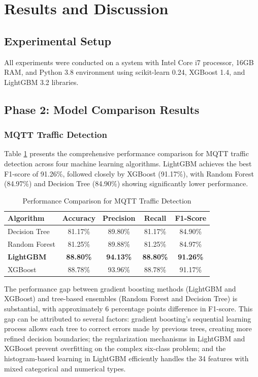 \documentclass[conference]{IEEEtran}
\begin{document}
\section{Results and Discussion}

\subsection{Experimental Setup}

All experiments were conducted on a system with Intel Core i7 processor, 16GB RAM, and Python 3.8 environment using scikit-learn 0.24, XGBoost 1.4, and LightGBM 3.2 libraries.


\subsection{Phase 2: Model Comparison Results}

\subsubsection{MQTT Traffic Detection}

Table \ref{tab:mqtt_results} presents the comprehensive performance comparison for MQTT traffic detection across four machine learning algorithms. LightGBM achieves the best F1-score of 91.26\%, followed closely by XGBoost (91.17\%), with Random Forest (84.97\%) and Decision Tree (84.90\%) showing significantly lower performance.

\begin{table}[htbp]
\centering
\caption{Performance Comparison for MQTT Traffic Detection}
\label{tab:mqtt_results}
\begin{tabular}{lcccc}
\toprule
Algorithm & Accuracy & Precision & Recall & F1-Score \\
\midrule
Decision Tree & 81.17\% & 89.80\% & 81.17\% & 84.90\% \\
Random Forest & 81.25\% & 89.88\% & 81.25\% & 84.97\% \\
\textbf{LightGBM} & \textbf{88.80\%} & \textbf{94.13\%} & \textbf{88.80\%} & \textbf{91.26\%} \\
XGBoost & 88.78\% & 93.96\% & 88.78\% & 91.17\% \\
\bottomrule
\end{tabular}
\end{table}

The performance gap between gradient boosting methods (LightGBM and XGBoost) and tree-based ensembles (Random Forest and Decision Tree) is substantial, with approximately 6 percentage points difference in F1-score. This gap can be attributed to several factors: gradient boosting's sequential learning process allows each tree to correct errors made by previous trees, creating more refined decision boundaries; the regularization mechanisms in LightGBM and XGBoost prevent overfitting on the complex six-class problem; and the histogram-based learning in LightGBM efficiently handles the 34 features with mixed categorical and numerical types.
\end{document}
